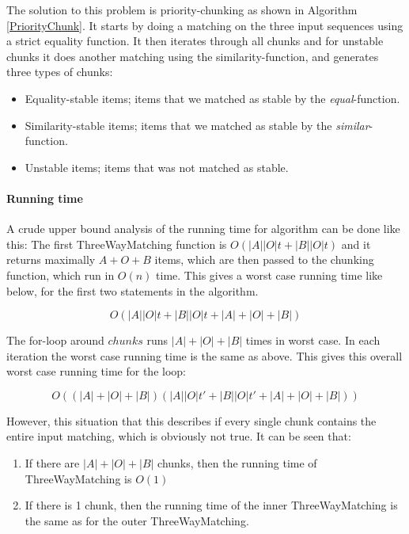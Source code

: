 \documentclass[11pt]{article}
\begin{document}
The solution to this problem is priority-chunking as shown in Algorithm \ref{PriorityChunk}. It starts by doing a matching on the three input sequences using a strict equality function. It then iterates through all chunks and for unstable chunks it does another matching using the similarity-function, and generates three types of chunks:

\begin{itemize}
   \item Equality-stable items; items that we matched as stable by the \textit{equal}-function.
   \item Similarity-stable items; items that we matched as stable by the \textit{similar}-function.
   \item Unstable items; items that was not matched as stable.
\end{itemize}


\paragraph{Running time} A crude upper bound analysis of the running time for algorithm can be done like this: The first ThreeWayMatching function is  $O(|A||O|t + |B||O|t)$ and it returns maximally $A+O+B$ items, which are then passed to the chunking function, which run in $O(n)$ time. This gives a worst case running time like below, for the first two statements in the algorithm.

\begin{equation}
O(|A||O|t + |B||O|t + |A|+|O|+|B|) \nonumber
\end{equation}

The for-loop around $chunks$ runs $|A|+|O|+|B|$ times in worst case. In each iteration the worst case running time is the same as above. This gives this overall worst case running time for the loop:

\begin{equation}
O((|A| + |O| + |B|) (|A||O|t' + |B||O|t' + |A|+|O|+|B|)) \nonumber
\end{equation}

However, this situation that this describes if every single chunk contains the entire input matching, which is obviously not true. It can be seen that:

\begin{enumerate}
\item If there are $|A|+|O|+|B|$ chunks, then the running time of ThreeWayMatching is $O(1)$
\item If there is 1 chunk, then the running time of the inner ThreeWayMatching is the same as for the outer ThreeWayMatching.
\end{enumerate}
\end{document}
